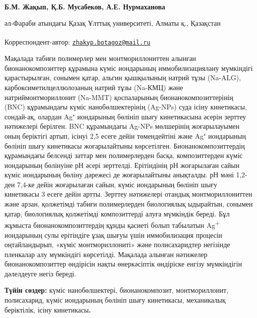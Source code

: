 
\begin{articleheader}

{\bfseries Б.М. Жақып\textsuperscript{\envelope }, Қ.Б. Мусабеков, А.Е. Нурмаханова}
\end{articleheader}

\begin{affiliation}
әл-Фараби атындағы Қазақ Ұлттық университеті, Алматы қ., Қазақстан

\raggedright {\bfseries \textsuperscript{\envelope }}Корреспондент-автор: \href{mailto:zhakyp.botagoz@mail.ru}{\nolinkurl{zhakyp.botagoz@mail.ru}}
\end{affiliation}

Мақалада табиғи полимерлер мен монтмориллониттен алынған
бионанокомпозиттер құрамына күміс иондарының иммобилизациялану
мүмкіндігі қарастырылған, сонымен қатар, альгин қышқылының натрий тұзы
(Na-ALG), карбоксиметилцеллюлозаның натрий тұзы (Na-КМЦ) және
натриймонтмориллонит (Na-MMT) қоспаларының бионанокомпозиттерінің (BNC)
құрамындағы күміс нанобөлшектерінің (Ag-NPs) суда ісіну кинетикасы,
сондай-ақ, олардан Ag⁺ иондарының бөлініп шығу кинетикасына әсерін
зерттеу нәтижелері берілген. BNC құрамындағы Ag-NPs мөлшерінің
жоғарылауымен оның беріктігі артып, ісінуі 2,5 есеге дейін төмендейтіні
және Ag⁺ иондарының бөлініп шығу кинетикасы жоғарылайтыны көрсетілген.
Бионанокомпозиттердің құрамындағы белсенді заттар мен полимерлерден
басқа, композиттерден күміс иондарының бөлінуіне рН әсері зерттелді.
Ерітіндінің рН жоғарылаған сайын күміс иондарының бөліну дәрежесі де
жоғарылайтыны анықталды. рН мәні 1,2-ден 7,4-ке дейін жоғарылаған сайын,
күміс иондарының бөлініп шығу кинетикасы 3 есеге дейін артты. Зерттеу
нәтижелері отандық монтмориллониттен және арзан, қолжетімді табиғи
полимерлерден биологиялық ыдырайтын, сонымен қатар, биологиялық
қолжетімді композиттерді алуға мүмкіндік береді. Бұл жұмыста
бионанокомпозиттердің құнды қасиеті болып табылатын
Ag\textsuperscript{+} иондарының сулы ерітіндіге ұзақ шығуы үшін
иммобилизация процесін оңтайландырып, «күміс монтмориллониті» және
полисахаридтер негізінде пленкалар алу мүмкіндігі көрсетілді. Мақалада
алынған нәтижелер бионанокомпозиттер өндірісін нақты өнеркәсіптік
өндіріске енгізу мүмкіндігін дәлелдеуге негіз береді.

{\bfseries Түйін сөздер:} күміс нанобөлшектері, бионанокомпозит,
монтмориллонит, полисахарид, күміс иондарының бөлініп шығу кинетикасы,
механикалық беріктілік, ісіну кинетикасы{\bfseries .}

